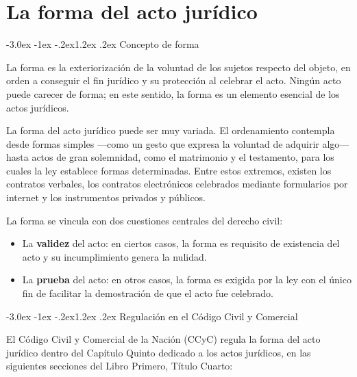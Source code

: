 \documentclass[12pt,oneside]{book}
\makeatletter
\renewcommand\section{\@startsection{section}{1}{\z@}%
  {-3.0ex \@plus -1ex \@minus -.2ex}{1.2ex \@plus .2ex}%
  {\normalfont\large\bfseries\color{acento}}}
\makeatother
\begin{document}
\chapter{La forma del acto jurídico}
\label{ch:forma}

\section{Concepto de forma}

\begin{definicion}
La forma es la exteriorización de la voluntad de los sujetos respecto del objeto, en orden a conseguir el fin jurídico y su protección al celebrar el acto. Ningún acto puede carecer de forma; en este sentido, la forma es un elemento esencial de los actos jurídicos.
\end{definicion}

La forma del acto jurídico puede ser muy variada. El ordenamiento contempla desde formas simples ---como un gesto que expresa la voluntad de adquirir algo--- hasta actos de gran solemnidad, como el matrimonio y el testamento, para los cuales la ley establece formas determinadas. Entre estos extremos, existen los contratos verbales, los contratos electrónicos celebrados mediante formularios por internet y los instrumentos privados y públicos.

La forma se vincula con dos cuestiones centrales del derecho civil:

\begin{itemize}
    \item La \textbf{validez} del acto: en ciertos casos, la forma es requisito de existencia del acto y su incumplimiento genera la nulidad.
    \item La \textbf{prueba} del acto: en otros casos, la forma es exigida por la ley con el único fin de facilitar la demostración de que el acto fue celebrado.
\end{itemize}

\section{Regulación en el Código Civil y Comercial}

El Código Civil y Comercial de la Nación (CCyC) regula la forma del acto jurídico dentro del Capítulo Quinto dedicado a los actos jurídicos, en las siguientes secciones del Libro Primero, Título Cuarto:
\end{document}
